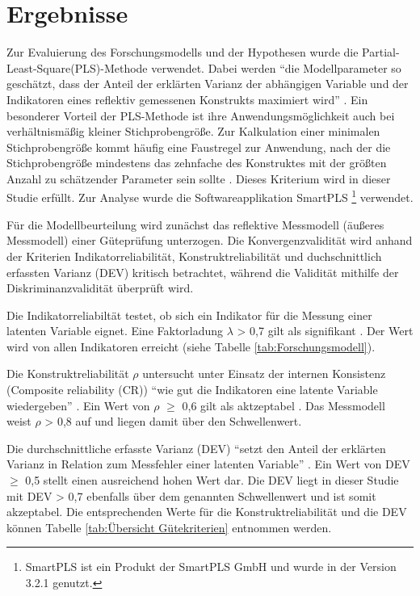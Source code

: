 \section{Ergebnisse}
\label{sec:ergebnisse}
\nocite{lohmoller2013latent}
Zur Evaluierung des Forschungsmodells und der Hypothesen wurde die Partial-Least-Square(PLS)-Methode verwendet. Dabei werden "`die Modellparameter so geschätzt, dass der Anteil der erklärten Varianz der abhängigen Variable und der Indikatoren eines reflektiv gemessenen Konstrukts maximiert wird"' \parencite[S.16]{nitzl2010anwenderorientierte}. Ein besonderer Vorteil der PLS-Methode ist ihre Anwendungsmöglichkeit auch bei verhältnismäßig kleiner Stichprobengröße. Zur Kalkulation einer minimalen Stichprobengröße kommt häufig eine Faustregel zur Anwendung, nach der die Stichprobengröße mindestens das zehnfache des Konstruktes mit der größten Anzahl zu schätzender Parameter sein sollte \parencite[vgl.][S.394]{islam2013investigating}. Dieses Kriterium wird in dieser Studie erfüllt. Zur Analyse wurde die Softwareapplikation SmartPLS \footnote{SmartPLS ist ein Produkt der SmartPLS GmbH und wurde in der Version 3.2.1 genutzt.} verwendet. 

Für die Modellbeurteilung wird zunächst das reflektive Messmodell (äußeres Messmodell) einer Güteprüfung unterzogen. Die Konvergenzvalidität wird anhand der Kriterien Indikatorreliabilität, Konstruktreliabilität und duchschnittlich erfassten Varianz (DEV) kritisch betrachtet, während die Validität mithilfe der Diskriminanzvalidität überprüft wird.

Die Indikatorreliabiltät testet, ob sich ein Indikator für die Messung einer latenten Variable eignet. Eine Faktorladung $\lambda$ > 0,7 gilt als signifikant \parencite[vgl.][S.24]{nitzl2010anwenderorientierte}. Der Wert wird von allen Indikatoren erreicht (siehe Tabelle \ref{tab:Forschungsmodell}). 

Die Konstruktreliabilität $\rho$ untersucht unter Einsatz der internen Konsistenz (Composite reliability (CR)) "`wie gut die Indikatoren eine latente Variable wiedergeben"' \parencite[S.25]{nitzl2010anwenderorientierte}. Ein Wert von $\rho$ $\geq$ 0,6 gilt als aktzeptabel \parencite[vgl.][S.212]{ringle2007beurteilung}. Das Messmodell weist $\rho$ > 0,8 auf und liegen damit über den Schwellenwert.  

Die durchschnittliche erfasste Varianz (DEV) "`setzt den Anteil der erklärten Varianz in Relation zum Messfehler einer latenten Variable"'  \parencite[S.25]{nitzl2010anwenderorientierte}. Ein Wert von DEV $\geq$ 0,5 stellt einen ausreichend hohen Wert dar. Die DEV liegt in dieser Studie mit DEV > 0,7 ebenfalls über dem genannten Schwellenwert und ist somit akzeptabel. Die entsprechenden Werte für die Konstruktreliabilität und die DEV können Tabelle \ref{tab:Übersicht Gütekriterien} entnommen werden.

